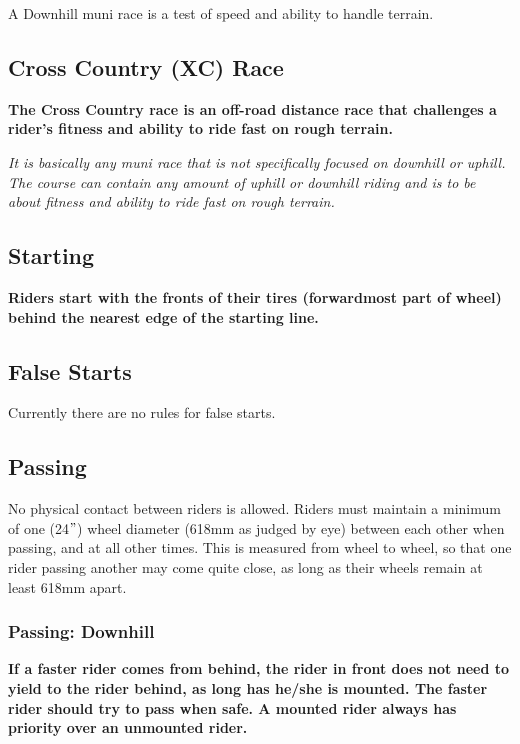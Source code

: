 A Downhill muni race is a test of speed and ability to handle terrain.

\subsection{Cross Country (XC) Race\label{sec:muni_xc}}

\textbf{The Cross Country race is an off-road distance race that challenges a rider's fitness and ability to ride fast on rough terrain.}

\textit{It is basically any muni race that is not specifically focused on downhill or uphill. The course can contain any amount of uphill or downhill riding and is to be about fitness and ability to ride fast on rough terrain.}

\subsection{Starting}

\textbf{
Riders start with the fronts of their tires (forwardmost part of wheel) behind the nearest edge of the starting line.}

\subsection{False Starts}

\begin{framed}
Currently there are no rules for false starts.
\end{framed}

\subsection{Passing}

No physical contact between riders is allowed.
Riders must maintain a minimum of one (24$"$) wheel diameter (618mm as judged by eye) between each other when passing, and at all other times.
This is measured from wheel to wheel, so that one rider passing another may come quite close, as long as their wheels remain at least 618mm apart.

\subsubsection{Passing: Downhill}

\textbf{If a faster rider comes from behind, the rider in front does not need to yield to the rider behind, as long has he/she is mounted. The faster rider should try to pass when safe. A mounted rider always has priority over an unmounted rider.}

